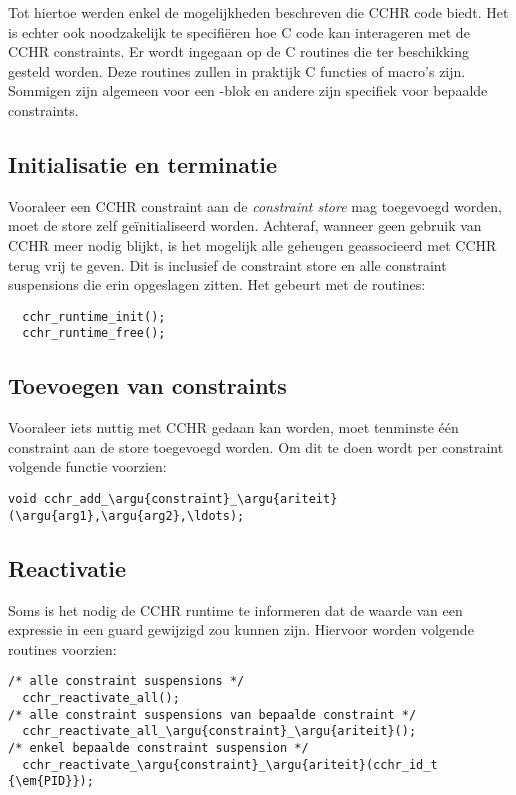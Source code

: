 Tot hiertoe werden enkel de mogelijkheden beschreven die CCHR code biedt. Het is echter ook noodzakelijk te specifi\"eren hoe C code kan interageren met de CCHR constraints. Er wordt ingegaan op de C routines die ter beschikking gesteld worden. Deze routines zullen in praktijk C functies of macro's zijn. Sommigen zijn algemeen voor een -blok en andere zijn specifiek voor bepaalde constraints.

\subsection{Initialisatie en terminatie}

Vooraleer een CCHR constraint aan de {\em constraint store} mag toegevoegd worden, moet de store zelf ge\"initialiseerd worden. Achteraf, wanneer geen gebruik van CCHR meer nodig blijkt, is het mogelijk alle geheugen geassocieerd met CCHR terug vrij te geven. Dit is inclusief de constraint store en alle constraint suspensions die erin opgeslagen zitten. Het gebeurt met de routines:
\begin{Verbatim}
  cchr_runtime_init();
  cchr_runtime_free();
\end{Verbatim}

\subsection{Toevoegen van constraints}

Vooraleer iets nuttig met CCHR gedaan kan worden, moet tenminste \'e\'en constraint aan de store toegevoegd worden. Om dit te doen wordt per constraint volgende functie voorzien: \begin{Verbatim}[commandchars=\\\{\}]
  void cchr_add_\argu{constraint}_\argu{ariteit}(\argu{arg1},\argu{arg2},\ldots);
\end{Verbatim}

\subsection{Reactivatie} \label{sec:crout-reactiv}

Soms is het nodig de CCHR runtime te informeren dat de waarde van een expressie in een guard gewijzigd zou kunnen zijn. Hiervoor worden volgende routines voorzien: \begin{Verbatim}[commandchars=\\\{\}]
/* alle constraint suspensions */
  cchr_reactivate_all(); 
/* alle constraint suspensions van bepaalde constraint */
  cchr_reactivate_all_\argu{constraint}_\argu{ariteit}();
/* enkel bepaalde constraint suspension */
  cchr_reactivate_\argu{constraint}_\argu{ariteit}(cchr_id_t {\em{PID}});
\end{Verbatim}

